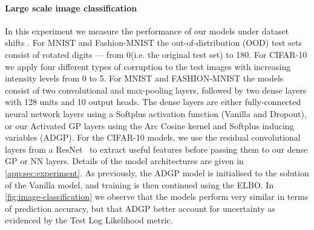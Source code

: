 \paragraph{Large scale image classification}
In this experiment we measure the performance of our models under dataset shifts \citep{Ovadia2019}. For MNIST and Fashion-MNIST the out-of-distribution (OOD) test sets consist of rotated digits --- from 0\textdegree (i.e. the original test set) to 180\textdegree. For CIFAR-10 we apply four different types of corruption to the test images with increasing intensity levels from 0 to 5. For MNIST and FASHION-MNIST the models consist of two convolutional and max-pooling layers, followed by two dense layers with 128 units and 10 output heads. The dense layers are either fully-connected neural network layers using a Softplus activation function (Vanilla and Dropout), or our Activated GP layers using the Arc Cosine kernel and Softplus inducing variables (ADGP). For the CIFAR-10 models, we use the residual convolutional layers from a ResNet~\citep{he2016deep} to extract useful features before passing them to our dense GP or NN layers. Details of the model architectures are given in \cref{app:sec:experiment}. As previously, the ADGP model is initialised to the solution of the Vanilla model, and training is then continued using the ELBO. In \cref{fig:image-classification} we observe that the models perform very similar in terms of prediction accuracy, but that ADGP better account for uncertainty as evidenced by the Test Log Likelihood metric.%

